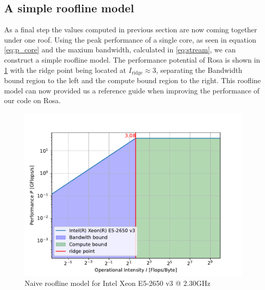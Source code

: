 \subsection{A simple roofline model}
As a final step the values computed in previous section are now coming together under one roof. Using the peak performance of a single core, as seen in equation \ref{eq:p_core} and the maxium bandwidth, calculated in \ref{eq:stream}, we can construct a simple roofline model.  The performance potential of Rosa is shown in \ref{fig:roofline} with the ridge point being located at $I_{\text{ridge}} \approx 3$, separating the Bandwidth bound region to the left and the compute bound region to the right.
This roofline model can now provided us a reference guide when improving the performance of our code on Rosa.
\begin{figure}[H]
	\centering
	\includegraphics[width=\textwidth]{../media/roofline.pdf}
	\caption{Naive roofline model for Intel Xeon E5-2650 v3 @ 2.30GHz}
	\label{fig:roofline}
\end{figure}




